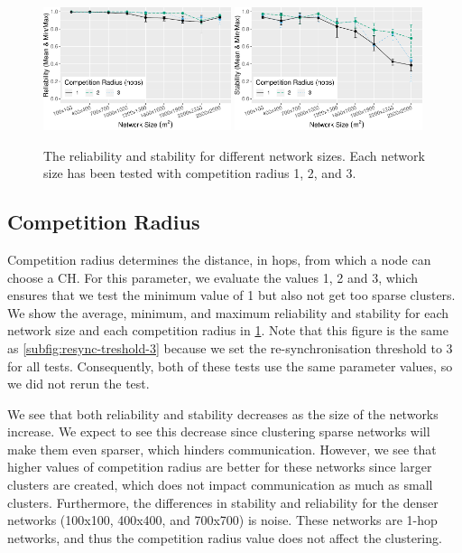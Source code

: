 \begin{figure}[bt]
    \centering
    \includegraphics[width=0.49\textwidth, keepaspectratio]{figure/Results/ParameterEvaluation/CompetitionRadius_Reliability.pdf}
    \includegraphics[width=0.49\textwidth, keepaspectratio]{figure/Results/ParameterEvaluation/CompetitionRadius_Stability.pdf}
    \caption{The reliability and stability for different network sizes. Each network size has been tested with competition radius 1, 2, and 3.}
    \label{fig:comp-radius-reliability}
\end{figure}

\subsection{Competition Radius}
\label{subsec:competition-radius}


\begin{newtext}
Competition radius determines the distance, in hops, from which a node can choose a CH. For this parameter, we evaluate the values 1, 2 and 3, which ensures that we test the minimum value of 1 but also not get too sparse clusters. We show the average, minimum, and maximum reliability and stability for each network size and each competition radius in \cref{fig:comp-radius-reliability}. Note that this figure is the same as \cref{subfig:resync-treshold-3} because we set the re-synchronisation threshold to 3 for all tests. Consequently, both of these tests use the same parameter values, so we did not rerun the test.

We see that both reliability and stability decreases as the size of the networks increase. We expect to see this decrease since clustering sparse networks will make them even sparser, which hinders communication. However, we see that higher values of competition radius are better for these networks since larger clusters are created, which does not impact communication as much as small clusters. Furthermore, the differences in stability and reliability for the denser networks (100x100, 400x400, and 700x700) is noise. These networks are 1-hop networks, and thus the competition radius value does not affect the clustering.
\end{newtext}

